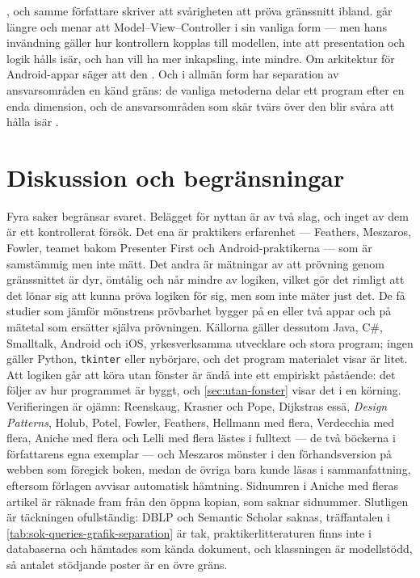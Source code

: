 \textcite{Fowler2006GUIArchitectures}
, och samme
författare skriver att svårigheten att pröva gränssnitt
ibland.  \Textcite{Holub2004} går längre och menar att
Model--View--Controller i sin vanliga form
 --- men hans
invändning gäller hur kontrollern kopplas till modellen, inte att
presentation och logik hålls isär, och han vill ha mer inkapsling, inte
mindre.  Om arkitektur för Android-appar säger
\textcite{Verdecchia2019Android} att den
.  Och i allmän form
har separation av ansvarsområden en känd gräns: de vanliga metoderna
delar ett program efter en enda dimension, och de ansvarsområden som
skär tvärs över den blir svåra att hålla isär \autocite{Tarr1999NDegrees}.

\section{Diskussion och begränsningar}
\label{sec:sep-diskussion-grafik}

Fyra saker begränsar svaret.  Belägget för nyttan är av två slag, och
inget av dem är ett kontrollerat försök.  Det ena är praktikers
erfarenhet --- Feathers, Meszaros, Fowler, teamet bakom
\foreignlanguage{english}{Presenter First} och Android-praktikerna ---
som är samstämmig men inte mätt.  Det andra är mätningar av att prövning
genom gränssnittet är dyr, ömtålig och når mindre av logiken, vilket gör
det rimligt att det lönar sig att kunna pröva logiken för sig, men som
inte mäter just det.  De få studier som jämför mönstrens prövbarhet
bygger på en eller två appar och på mätetal som ersätter själva
prövningen.  Källorna gäller dessutom Java, C\#, Smalltalk, Android och
iOS, yrkesverksamma utvecklare och stora program; ingen gäller Python,
\texttt{tkinter} eller nybörjare, och det program materialet
visar är litet.  Att logiken går att köra utan fönster är ändå inte ett
empiriskt påstående: det följer av hur programmet är byggt, och
\cref{sec:utan-fonster} visar det i en körning.  Verifieringen är
ojämn: Reenskaug, Krasner och Pope, Dijkstras essä, \emph{Design
Patterns}, Holub, Potel, Fowler, Feathers, Hellmann med flera, Verdecchia
med flera, Aniche med flera och Lelli med flera lästes i fulltext ---
de två böckerna i författarens egna exemplar --- och Meszaros mönster
i den förhandsversion på webben som föregick boken, medan de övriga
bara kunde läsas i sammanfattning, eftersom förlagen avvisar
automatisk hämtning.  Sidnumren i Aniche med fleras artikel är räknade
fram från den öppna kopian, som saknar sidnummer.  Slutligen är
täckningen ofullständig: DBLP och Semantic Scholar saknas, träffantalen i
\cref{tab:sok-queries-grafik-separation} är tak, praktikerlitteraturen
finns inte i databaserna och hämtades som kända dokument, och
klassningen är modellstödd, så antalet stödjande poster är en övre gräns.

